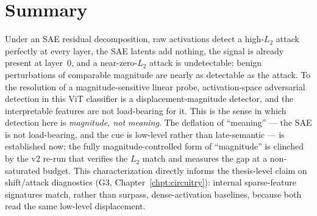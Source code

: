 \documentclass[../ppgc-tese.tex]{subfiles}
\begin{document}
\section{Summary}
\label{sec:adv-summary}
Under an SAE residual decomposition, raw activations detect a high-$L_2$ attack
perfectly at every layer, the SAE latents add nothing, the signal is already present
at layer~0, and a near-zero-$L_2$ attack is undetectable; benign perturbations of
comparable magnitude are nearly as detectable as the attack. To the resolution of a
magnitude-sensitive linear probe, activation-space adversarial detection in this ViT
classifier is a displacement-magnitude detector, and the interpretable features are
not load-bearing for it. This is the sense in which detection here is
\emph{magnitude, not meaning}. The deflation of ``meaning'' --- the SAE is not
load-bearing, and the cue is low-level rather than late-semantic --- is established
now; the fully magnitude-controlled form of ``magnitude'' is clinched by the v2
re-run that verifies the $L_2$ match and measures the gap at a non-saturated budget.
This characterization directly informs the thesis-level claim on shift/attack
diagnostics (G3, Chapter~\ref{chpt:circuitry}): internal sparse-feature signatures
match, rather than surpass, dense-activation baselines, because both read the same
low-level displacement.
\end{document}
